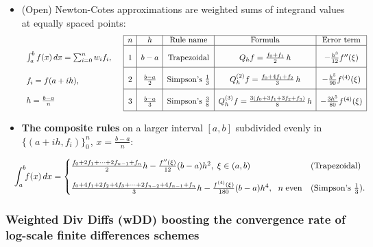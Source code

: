 \documentclass[a4paper]{article}
\begin{document}
\begin{itemize}
  \item (Open) Newton-Cotes approximations are
  weighted sums of integrand values at equally spaced points:
  \[
\lower3em
\hbox{\begin{array}[t]{l}
    \int_a^bf(x)\,dx
      = \sum_{i=0}^{n} w_if_i,
      \\[17pt]
      f_i =f(a+ih),
      \\[12pt]
      h = \frac{b-a}{n}
    \end{array}}
  \quad
    \begin{array}[t]{*{12}{|c}|}
      \hline n & h & \text{Rule name}& \text{Formula} & \text{Error term} \\ \hline
      \rule[0pt]{0pt}{18pt} 1 & b-a &  \text{Trapezoidal}
      & Q_hf = \frac{f_0+f_1}{2}\,h & -\frac{h^3}{12}f''(\xi)
      \\[5pt] \hline
      \rule[0pt]{0pt}{18pt} 2 & \frac{b-a}{2} &  \text{Simpson's $\tfrac13$}
      & Q^{(2)}_{h}f=\frac{f_0+4f_1+f_2}{3}\,h & -\frac{h^5}{90}f^{(4)}(\xi)
      \\[5pt] \hline
      \rule[0pt]{0pt}{18pt} 3 & \frac{b-a}{3} &  \text{Simpson's $\tfrac38$}
      & Q^{(3)}_{h}f=\frac{3(f_0+3f_1+3f_2+f_3)}{8}\,h & -\frac{3h^5}{80}f^{(4)}(\xi)
      \\[5pt] \hline
    \end{array}
  \]

  \item
  \textbf{The composite rules} on a larger interval $[a,b]$ subdivided evenly in
    $\{(a+ih,f_i)\}_0^n$, $x=\frac{b-a}{n}$:

    \[
      \hspace{-1em}
      \int_a^b\mkern-6muf(x)\,dx
      =
      \begin{cases}
        \frac{f_0+2f_1+\cdots+2f_{n-1}+f_n}{2}h %
        -\tfrac{f''(\xi)}{12}(b-a)h^2, \; \xi\in(a,b)
        & \text{(Trapezoidal)}
        \\[10pt]
        \frac{f_0+4f_1+2f_2+4f_3+\cdots+2f_{n-2}+4f_{n-1}+f_n}{3} h %
        -\tfrac{f^{(4)}(\xi)}{180}(b-a)h^4,\;
        ~n\;\text{even}
        & \text{(Simpson's $\tfrac13$).}
      \end{cases}
    \]

\end{itemize}%

\subsubsection*{Weighted Div Diffs (wDD) boosting the convergence rate of log-scale finite differences schemes} %
\end{document}
